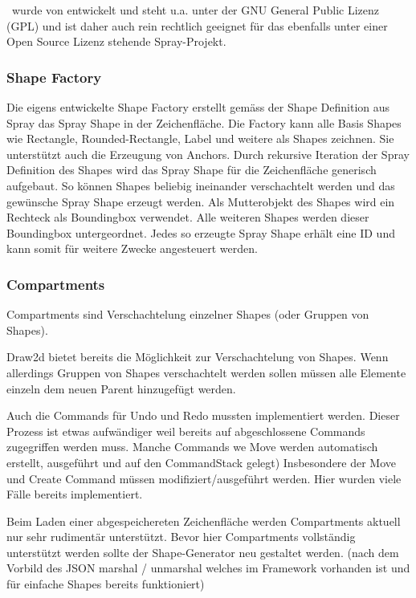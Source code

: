 \noindent \dd~wurde von \citep{dd} entwickelt und steht u.a. unter der GNU General
Public Lizenz (GPL) und ist daher auch rein rechtlich geeignet für
das ebenfalls unter einer Open Source Lizenz stehende Spray-Projekt.

\subsubsection{Shape Factory}

Die eigens entwickelte Shape Factory erstellt gemäss der Shape Definition aus Spray das Spray Shape in der Zeichenfläche.
Die Factory kann alle Basis Shapes wie Rectangle, Rounded-Rectangle, Label und weitere als \dd Shapes zeichnen.
Sie unterstützt auch die Erzeugung von Anchors. Durch rekursive Iteration der Spray Definition des Shapes wird
das Spray Shape für die Zeichenfläche generisch aufgebaut. So können \dd Shapes beliebig ineinander verschachtelt werden
und das gewünsche Spray Shape erzeugt werden. Als Mutterobjekt des Shapes wird ein Rechteck als Boundingbox verwendet.
Alle weiteren Shapes werden dieser Boundingbox untergeordnet. Jedes so erzeugte Spray Shape erhält eine \dd ID und kann somit
für weitere Zwecke angesteuert werden.

\subsubsection{Compartments}

Compartments sind Verschachtelung einzelner Shapes (oder Gruppen von Shapes).

Draw2d bietet bereits die Möglichkeit zur Verschachtelung von Shapes.
Wenn allerdings Gruppen von Shapes verschachtelt werden sollen müssen alle Elemente einzeln dem neuen Parent hinzugefügt werden.

Auch die Commands für Undo und Redo mussten implementiert werden.
Dieser Prozess ist etwas aufwändiger weil bereits auf abgeschlossene Commands zugegriffen werden muss. 
Manche Commands we Move werden automatisch erstellt, ausgeführt und auf den CommandStack gelegt)
Insbesondere der Move und Create Command müssen modifiziert/ausgeführt werden.
Hier wurden viele Fälle bereits implementiert.

Beim Laden einer abgespeichereten Zeichenfläche werden Compartments aktuell nur sehr rudimentär unterstützt.
Bevor hier Compartments vollständig unterstützt werden sollte der Shape-Generator neu gestaltet werden.
(nach dem Vorbild des JSON marshal / unmarshal welches im Framework vorhanden ist und für einfache Shapes bereits funktioniert)

